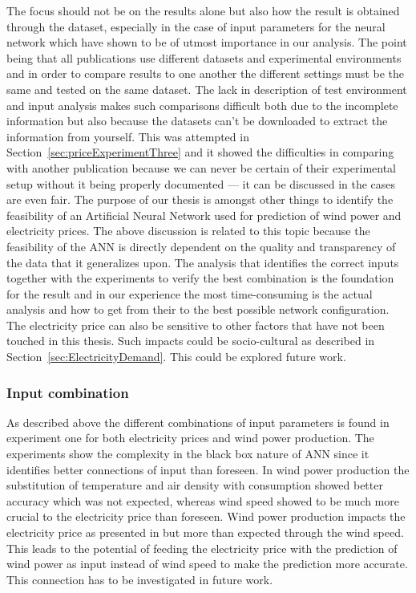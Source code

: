 The focus should not be on the results alone but also how the result is obtained through the dataset, especially in the case of input parameters for the neural network which have shown to be of utmost importance in our analysis. The point being that all publications use different datasets and experimental environments and in order to compare results to one another the different settings must be the same and tested on the same dataset. The lack in description of test environment and input analysis makes such comparisons difficult both due to the incomplete information but also because the datasets can't be downloaded to extract the information from yourself. This was attempted in Section~\ref{sec:priceExperimentThree} and it showed the difficulties in comparing with another publication because we can never be certain of their experimental setup without it being properly documented --- it can be discussed in the cases are even fair. The purpose of our thesis is amongst other things to identify the feasibility of an Artificial Neural Network used for prediction of wind power and electricity prices. The above discussion is related to this topic because the feasibility of the ANN is directly dependent on the quality and transparency of the data that it generalizes upon. The analysis that identifies the correct inputs together with the experiments to verify the best combination is the foundation for the result and in our experience the most time-consuming is the actual analysis and how to get from their to the best possible network configuration. 
\\[0.5cm]
The electricity price can also be sensitive to other factors that have not been touched in this thesis. Such impacts could be socio-cultural as described in Section~\ref{sec:ElectricityDemand}. This could be explored future work. 

\subsubsection{Input combination}
As described above the different combinations of input parameters is found in experiment one for both electricity prices and wind power production. The experiments show the complexity in the black box nature of ANN since it identifies better connections of input than foreseen. In wind power production the substitution of temperature and air density with consumption showed better accuracy which was not expected, whereas wind speed showed to be much more crucial to the electricity price than foreseen. Wind power production impacts the electricity price as presented in \cite{dayAheadImpactOfWindPowerForecasts} but more than expected through the wind speed. This leads to the potential of feeding the electricity price with the prediction of wind power as input instead of wind speed to make the prediction more accurate. This connection has to be investigated in future work.

